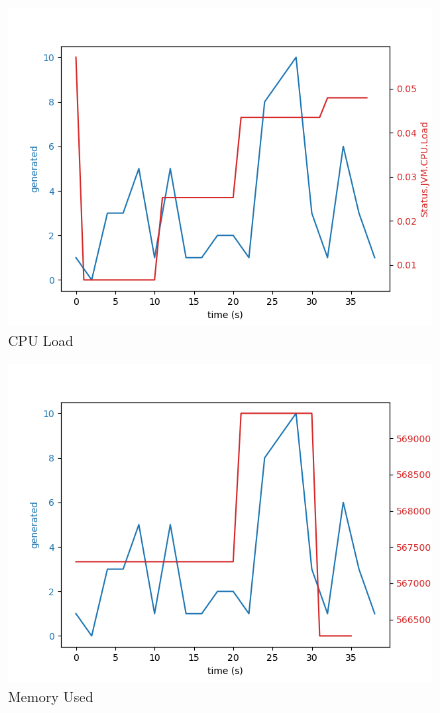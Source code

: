 \begin{figure}
   \centering
   \includegraphics[scale=0.70]{figures/cpu-load.png}
\caption{CPU Load}    
\label{fig:bench-cpu}
\end{figure}

\begin{figure}
   \centering
   \includegraphics[scale=0.70]{figures/memory-used.png}
\caption{Memory Used}    
\label{fig:bench-memory}
\end{figure}

